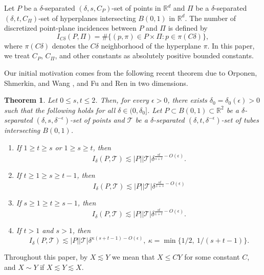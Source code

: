 \documentclass[11pt]{article}
\newtheorem{theorem}{Theorem}[section]
\newcommand{\1}{\mathbf{1}}
\begin{document}
 Let $P$ be a $\delta$-separated $(\delta, s, C_P)$-set of points in $\mathbb{R}^d$ and $\Pi$ be a $\delta$-separated $(\delta, t, C_\Pi)$-set of hyperplanes intersecting $B(0, 1)$ in $\mathbb{R}^d$. The number of discretized point-plane incidences between $P$ and $\Pi$ is defined by
    \[I_{C\delta}(P, \Pi)=\#\{(p, \pi)\in P\times \Pi\colon p\in \pi(C\delta)\},\] 
where $\pi(C\delta)$ denotes the $C\delta$ neighborhood of the hyperplane $\pi$. In this paper, we treat $C_P$, $C_\Pi$, and other constants as absolutely positive bounded constants. 

Our initial motivation comes from the following recent theorem due to Orponen, Shmerkin, and Wang \cite{motmot}, and Fu and Ren \cite{FuRen} in two dimensions. 
\begin{theorem}\label{twodimension}
    Let $0\le s, t\le 2$. Then, for every $\epsilon>0$, there exists $\delta_0=\delta_0(\epsilon)>0$ such that the following holds for all $\delta\in (0, \delta_0]$. Let $P\subset B(0, 1)\subset \mathbb{R}^2$ be a $\delta$-separated $(\delta, s, \delta^{-\epsilon})$-set of points and $\mathcal{T}$ be a $\delta$-separated $(\delta, t, \delta^{-\epsilon})$-set of tubes intersecting $B(0, 1)$. 
    \begin{enumerate}
    \item If $1\ge t\ge s$ or $1\ge s\ge t$, then 
    \[I_{\delta}(P, \mathcal{T})\lesssim |P||\mathcal{T}|\delta^{\frac{st}{s+t}-O(\epsilon)}.\]
     \item If $t\ge 1\ge s\ge t-1$, then 
    \[I_{\delta}(P, \mathcal{T})\lesssim |P||\mathcal{T}|\delta^{\frac{st}{1+s}-O(\epsilon)}\]
\item If $s\ge 1\ge t\ge s-1$, then 
\[I_{\delta}(P, \mathcal{T})\lesssim |P||\mathcal{T}|\delta^{\frac{st}{1+t}-O(\epsilon)}.\]    
        \item If $t>1$ and $s>1$, then 
        \[I_{\delta}(P, \mathcal{T})\lesssim |P||\mathcal{T}|\delta^{\kappa(s+t-1)-O(\epsilon)},~\kappa=\min \{1/2, ~1/(s+t-1)\}.\]
    \end{enumerate}
\end{theorem}
Throughout this paper, by $X\lesssim Y$ we mean that $X\le CY$ for some constant $C$, and $X\sim Y$ if $X\lesssim Y\lesssim X$. 
\end{document}
